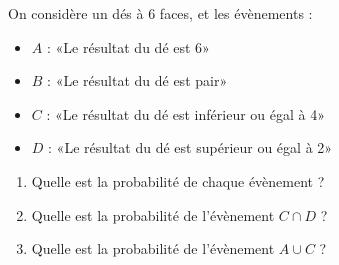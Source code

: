 \documentclass{beamer}
\begin{document}
\begin{frame}
	On considère un dés à 6 faces, et les évènements :
	\begin{itemize}
		\item $A$ : «Le résultat du dé est 6»
		\item $B$ : «Le résultat du dé est pair»
		\item $C$ : «Le résultat du dé est inférieur ou égal à 4»
		\item $D$ : «Le résultat du dé est supérieur ou égal à 2»
	\end{itemize}

	\begin{enumerate}
		\item Quelle est la probabilité de chaque évènement ?
		\item Quelle est la probabilité de l'évènement $C ∩ D$ ?
		\item Quelle est la probabilité de l'évènement $A ∪ C$ ?
	\end{enumerate}
\end{frame}
\end{document}
